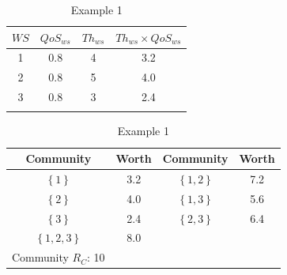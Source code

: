 \documentclass[10pt,journal,cspaper,compsoc]{IEEEtran}
\begin{document}
\begin{table}[!t]
\renewcommand{\arraystretch}{1.3}
\caption{Example 1} \label{example_1} \centering
\begin{tabular}{c c c c}
\hline
$WS$ & $QoS_{ws}$ & $Th_{ws}$ & $Th_{ws} \times QoS_{ws}$\\
\hline
1 & 0.8 & 4 & 3.2\\
2 & 0.8 & 5 & 4.0\\
3 & 0.8 & 3 & 2.4\\
\hline\\
\end{tabular}
%
\renewcommand{\arraystretch}{1.3}
\label{example_1_2} \centering
\begin{tabular}{c c || c c}
\hline
Community & Worth & Community & Worth\\
\hline
$\left\{1\right\}$ & 3.2 & $\left\{1,2\right\}$ & 7.2\\
$\left\{2\right\}$ & 4.0 & $\left\{1,3\right\}$ & 5.6\\
$\left\{3\right\}$ & 2.4 & $\left\{2,3\right\}$ & 6.4\\
$\left\{1,2,3\right\}$ & 8.0\\
\hline
Community $R_C$: 10\\
\hline
\end{tabular}
\end{table}
\end{document}
